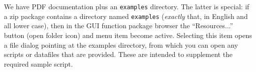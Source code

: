 \documentclass[oneside]{book}
\begin{document}
We have PDF documentation plus an \texttt{examples} directory. The
latter is special: if a zip package contains a directory named
\texttt{examples} (\textit{exactly} that, in English and all lower
case), then in the GUI function package browser the ``Resources...''
button (open folder icon) and menu item become active. Selecting this
item opens a file dialog pointing at the examples directory, from
which you can open any scripts or datafiles that are provided. These
are intended to supplement the required sample script.



\end{document}
